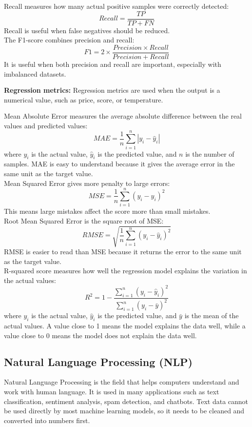 \documentclass[12pt,a4paper]{report}
\begin{document}
\noindent Recall measures how many actual positive samples were correctly detected:
\[
Recall = \frac{TP}{TP + FN}
\]
\noindent Recall is useful when false negatives should be reduced.\\

\noindent The F1-score combines precision and recall:
\[
F1 = 2 \times \frac{Precision \times Recall}{Precision + Recall}
\]
\noindent It is useful when both precision and recall are important, especially with
imbalanced datasets.

\noindent\textbf{Regression metrics:}
Regression metrics are used when the output is a numerical value, such as price,
score, or temperature.

\noindent Mean Absolute Error measures the average absolute difference between the real
values and predicted values:
\[
MAE = \frac{1}{n}\sum_{i=1}^{n}|y_i - \hat{y}_i|
\]
\noindent where $y_i$ is the actual value, $\hat{y}_i$ is the predicted value, and $n$ is
the number of samples. MAE is easy to understand because it gives the average
error in the same unit as the target value.\\

\noindent Mean Squared Error gives more penalty to large errors:
\[
MSE = \frac{1}{n}\sum_{i=1}^{n}(y_i - \hat{y}_i)^2
\]
\noindent This means large mistakes affect the score more than small mistakes.\\

\noindent Root Mean Squared Error is the square root of MSE:
\[
RMSE = \sqrt{\frac{1}{n}\sum_{i=1}^{n}(y_i - \hat{y}_i)^2}
\]
\noindent RMSE is easier to read than MSE because it returns the error to the same unit as
the target value.\\

\noindent R-squared score measures how well the regression model explains the variation in
the actual values:
\[
R^2 = 1 - \frac{\sum_{i=1}^{n}(y_i - \hat{y}_i)^2}{\sum_{i=1}^{n}(y_i - \bar{y})^2}
\]
\noindent where $y_i$ is the actual value, $\hat{y}_i$ is the predicted value, and
$\bar{y}$ is the mean of the actual values. A value close to 1 means the model
explains the data well, while a value close to 0 means the model does not explain
the data well.

\subsection{Natural Language Processing (NLP) ~\cite{sabharwal2021introduction}}
\noindent Natural Language Processing is the field that helps computers
understand and work with human language. It is used in many applications such as
text classification, sentiment analysis, spam detection, and chatbots. Text data
cannot be used directly by most machine learning models, so it needs to be
cleaned and converted into numbers first.
\end{document}
